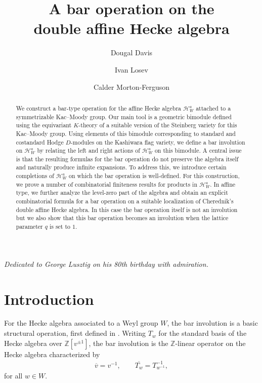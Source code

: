 \documentclass{amsart}
\title[A bar operation on the double affine Hecke algebra]{A bar operation on the\\ double affine Hecke algebra}
\author{Dougal Davis}
\author{Ivan Losev}
\author{Calder Morton-Ferguson}
\newcommand{\Ha}{\mathcal{H}_{W}^a}
\theoremstyle{definition}
\numberwithin{equation}{section}
\begin{document}
\begin{abstract}
    We construct a bar-type operation for the affine Hecke algebra $\Ha$ attached to a symmetrizable Kac--Moody group. Our main tool is a geometric bimodule defined using the equivariant $K$-theory of a suitable version of the Steinberg variety for this Kac--Moody group. Using elements of this bimodule corresponding to standard and costandard Hodge $D$-modules on the Kashiwara flag variety, we define a bar involution on $\Ha$ by relating the left and right actions of $\Ha$ on this bimodule. A central issue is that the resulting formulas for the bar operation do not preserve the algebra itself and naturally produce infinite expansions. To address this, we introduce certain completions of $\Ha$ on which the bar operation is well-defined. For this construction, we prove a number of combinatorial finiteness results for products in $\Ha$. In affine type, we further analyze the level-zero part of the algebra and obtain an explicit combinatorial formula for a bar operation on a suitable localization of Cherednik's double affine Hecke algebra. In this case the bar operation itself is not an involution but we also show that this bar operation becomes an involution when the lattice parameter $q$ is set to $1$.
\end{abstract}

\maketitle

\begin{center}
{\it Dedicated to George Lusztig on his 80th birthday with admiration.}
\end{center}

\section{Introduction}

For the Hecke algebra associated to a Weyl group $W$, the bar involution is a basic structural operation, first defined in \cite{KL79}. Writing $T_{w}$ for the standard basis of the Hecke algebra over $\mathbb{Z}[v^{\pm 1}]$, { the bar involution is the $\mathbb{Z}$-linear operator on the Hecke algebra  characterized by}
\begin{align}
    \overline{v}=v^{-1},\qquad \overline{T_w}=T_{w^{-1}}^{-1},\label{eqn:bar-tw}
\end{align}
for all $w \in W$.
\end{document}
